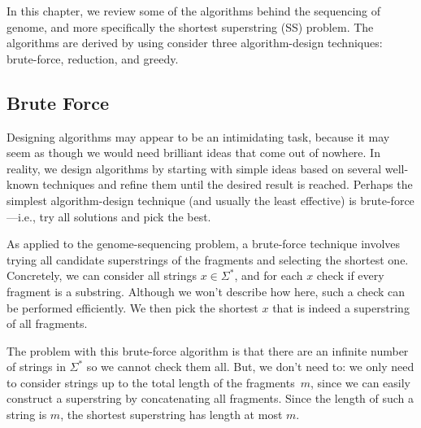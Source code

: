 \begin{gram}[Overview]
In this chapter, we review some of the algorithms behind the
sequencing of genome, and more specifically the shortest superstring (SS) problem.
%
The algorithms are derived by using consider three algorithm-design
techniques: brute-force, reduction, and greedy.
\end{gram}


\subsection{Brute Force}
\label{genome::alg::bf}

\begin{gram}
Designing algorithms may appear to be an intimidating task, because it
may seem as though we would need brilliant ideas that come out of
nowhere. 
%
In reality, we design algorithms by starting with simple ideas based
on several well-known techniques and refine them until  the
desired result is reached.
%
Perhaps the simplest algorithm-design technique (and usually the least
effective) is brute-force---i.e., try all solutions and pick the best.
\end{gram}


\begin{gram}
As applied to the genome-sequencing problem, a brute-force technique
involves trying all candidate superstrings of the fragments and
selecting the shortest one.
%
Concretely, we can consider all strings $x \in \Sigma^*$, and for each
$x$ check if every fragment is a substring.
%
Although we won't describe how here, such a check can be performed
efficiently.
%
We then pick the shortest $x$ that is indeed a superstring of
all fragments.
%

The problem with this brute-force algorithm is that there are an
infinite number of strings in $\Sigma^*$ so we cannot check them all.
%
But, we don't need to: we only need to consider strings up to
the total length of the fragments~$m$, since we can easily construct a
superstring by concatenating all fragments. 
%
Since the length of such a string is $m$, the shortest superstring has
length at most $m$.
\end{gram}

